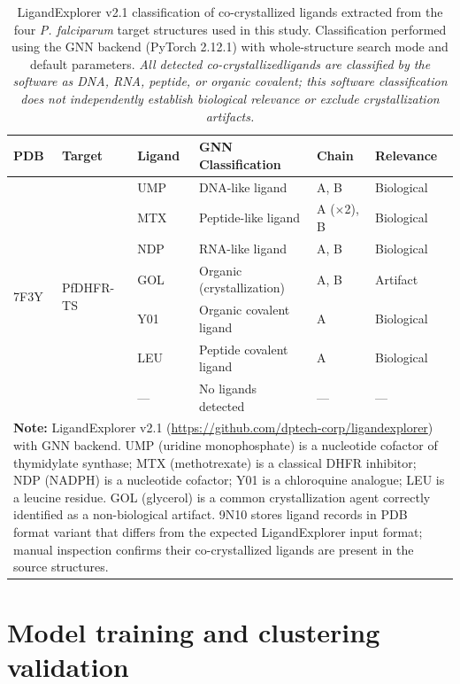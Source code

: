 \documentclass[journal=jcisd8,manuscript=suppinfo]{achemso}
\begin{document}
\begin{table}[!htbp]
\centering
\caption{LigandExplorer v2.1 classification of co-crystallized ligands extracted from the four \textit{P. falciparum} target structures used in this study.
Classification performed using the GNN backend (PyTorch 2.12.1) with whole-structure search mode and default parameters. \textit{All detected co-crystallizedligands are classified by the software as DNA, RNA, peptide, or organic covalent; this software classification does not independently establish biological relevance or exclude crystallization artifacts.}}
\label{tab:sm_ligandexplorer}
\small
\begin{tabular}{@{}l l l l l l@{}}
\toprule
\textbf{PDB} & \textbf{Target} & \textbf{Ligand} & \textbf{GNN Classification} & \textbf{Chain} & \textbf{Relevance} \\
\midrule
\multirow{7}{*}{7F3Y} & \multirow{7}{*}{PfDHFR-TS} & UMP & DNA-like ligand & A, B & Biological \\
& & MTX & Peptide-like ligand & A ($\times$2), B & Biological \\
& & NDP & RNA-like ligand & A, B & Biological \\
& & GOL & Organic (crystallization) & A, B & Artifact \\
\cmidrule{2-6}
\multirow{2}{*}{6UKJ} & \multirow{2}{*}{PfCRT} & Y01 & Organic covalent ligand & A & Biological \\
& & LEU & Peptide covalent ligand & A & Biological \\
\cmidrule{2-6}
9N10 & PfATP4 & --- & No ligands detected & --- & --- \\
\cmidrule{2-6}
\bottomrule
\multicolumn{6}{p{14cm}}{
\noindent\textbf{Note:} LigandExplorer v2.1 (\url{https://github.com/dptech-corp/ligandexplorer}) with GNN backend. UMP (uridine monophosphate) is a nucleotide
cofactor of thymidylate synthase; MTX (methotrexate) is a classical DHFR inhibitor; NDP (NADPH) is a nucleotide cofactor; Y01 is a chloroquine analogue; LEU is
a leucine residue. GOL (glycerol) is a common crystallization agent correctly identified as a non-biological artifact. 9N10 stores ligand records in PDB format
variant that differs from the expected LigandExplorer input format; manual inspection confirms their co-crystallized ligands are present in the source structures.
}
\end{tabular}
\end{table}

\clearpage

\section*{Model training and clustering validation}
\end{document}
